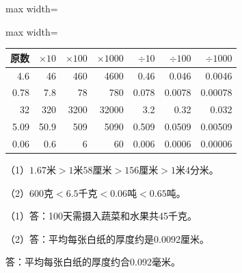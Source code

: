 
\begingroup\color{answerred}\par\smallskip\noindent\begin{adjustbox}{max width=\linewidth}\begin{adjustbox}{max width=\linewidth}\begin{tabular}{r|rrrrrr}\toprule 原数&$\times10$&$\times100$&$\times1000$&$\div10$&$\div100$&$\div1000$\\\midrule

4.6&46&460&4600&0.46&0.046&0.0046\\

0.78&7.8&78&780&0.078&0.0078&0.00078\\

32&320&3200&32000&3.2&0.32&0.032\\

5.09&50.9&509&5090&0.509&0.0509&0.00509\\

0.06&0.6&6&60&0.006&0.0006&0.00006\\

\bottomrule\end{tabular}\end{adjustbox}\end{adjustbox}\par\smallskip\par\endgroup
{}
\begingroup\color{answerred}\noindent（1）$1.67$米$>1$米$58$厘米$>156$厘米$>1$米$4$分米。\par
\noindent（2）$600$克$<6.5$千克$<0.06$吨$<0.65$吨。\par\par\endgroup
{}
\begingroup\color{answerred}\noindent（1）答：100天需摄入蔬菜和水果共45千克。\par
\noindent（2）答：平均每张白纸的厚度约是0.0092厘米。\par\hspace*{2em}答：平均每张白纸的厚度约合0.092毫米。\par\par\endgroup
